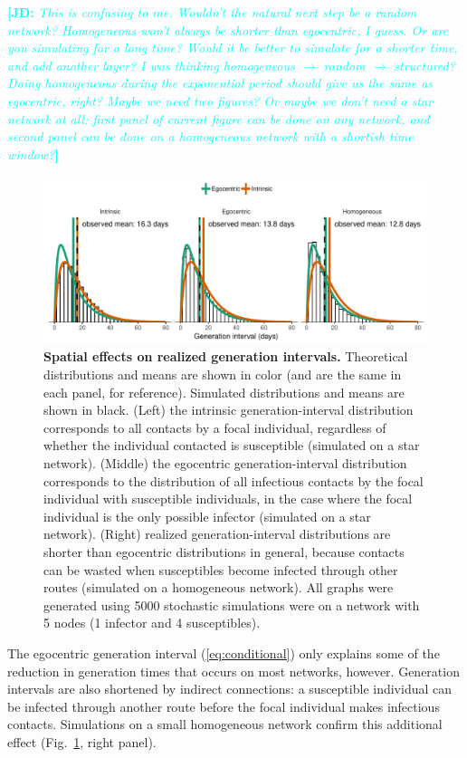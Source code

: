 \documentclass[12pt]{article}
\newcommand{\eref}[1]{(\ref{eq:#1})}
\newcommand{\fref}[1]{Fig.~\ref{fig:#1}}
\newcommand{\comment}[3]{\textcolor{#1}{\textbf{[#2: }\textsl{#3}\textbf{]}}}
\newcommand{\jd}[1]{\comment{cyan}{JD}{#1}}
\begin{document}
\jd{This is confusing to me. Wouldn't the natural next step be a random network? Homogeneous won't always be shorter than egocentric, I guess. Or are you simulating for a long time? Would it be better to simulate for a shorter time, and add another layer? I was thinking homogeneous $\to$ random $\to$ structured? Doing homogeneous during the exponential period should give us the same as egocentric, right? Maybe we need two figures? Or maybe we don't need a star network at all: first panel of current figure can be done on any network, and second panel can be done on a homogeneous network with a shortish time window?} 
\begin{figure}
\includegraphics[width=\textwidth]{../fig/local_effect.pdf}
\caption{
\textbf{Spatial effects on realized generation intervals.}
Theoretical distributions and means are shown in color (and are the same in each panel, for reference). Simulated distributions and means are shown in black.
(Left) the intrinsic generation-interval distribution corresponds to all contacts by a focal individual, regardless of whether the individual contacted is susceptible (simulated on a star network).
(Middle) the egocentric generation-interval distribution corresponds to the distribution of all infectious contacts by the focal individual with susceptible individuals, in the case where the focal individual is the only possible infector (simulated on a star network).
(Right) realized generation-interval distributions are shorter than egocentric distributions in general, because contacts can be wasted when susceptibles become infected through other routes (simulated on a homogeneous network).
All graphs were generated using 5000 stochastic simulations were on a network with 5 nodes (1 infector and 4 susceptibles).
}
\label{fig:local}
\end{figure}

The egocentric generation interval \eref{conditional} only explains some of the reduction in generation times that occurs on most networks, however.
Generation intervals are also shortened by indirect connections: a susceptible individual can be infected through another route before the focal individual makes infectious contacts.
Simulations on a small homogeneous network confirm this additional effect (\fref{local}, right panel). 
\end{document}
